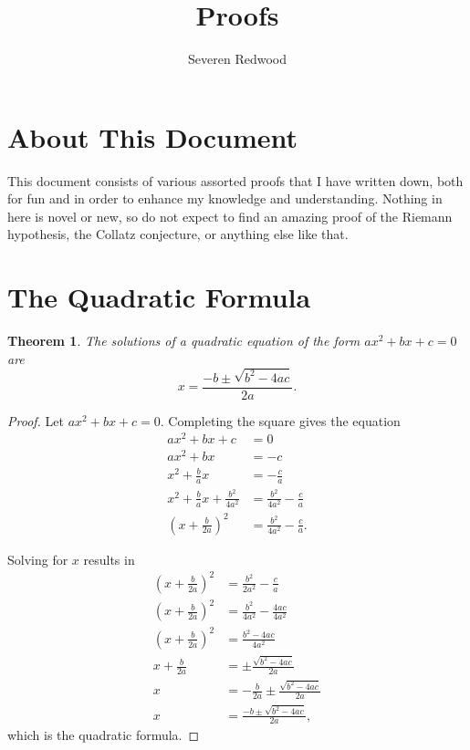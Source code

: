 \documentclass[parskip]{scrartcl}
\title{Proofs}
\author{Severen Redwood}
\newtheorem*{theorem}{Theorem}
\begin{document}
\maketitle

\section{About This Document}

This document consists of various assorted proofs that I have written down, both
for fun and in order to enhance my knowledge and understanding. Nothing in here
is novel or new, so do not expect to find an amazing proof of the Riemann
hypothesis, the Collatz conjecture, or anything else like that.

\section{The Quadratic Formula}

\begin{theorem}
  The solutions of a quadratic equation of the form \(ax^{2} + bx + c = 0\) are
  \[ x = \frac{-b ±\sqrt{b^{2} - 4ac}}{2a}. \]
\end{theorem}

\begin{proof}
  Let \(ax^{2} + bx + c = 0\). Completing the square gives the equation
  \begin{align*}
    ax^{2} + bx + c &= 0 \\
    ax^{2} + bx &= -c \\
    x^{2} + \frac{b}{a}x &= -\frac{c}{a} \\
    x^{2} + \frac{b}{a}x + \frac{b^{2}}{4a^{2}} &= \frac{b^{2}}{4a^{2}} - \frac{c}{a} \\
    {(x + \frac{b}{2a})}^{2} &= \frac{b^{2}}{4a^{2}} - \frac{c}{a}.
  \end{align*}

  Solving for \(x\) results in
  \begin{align*}
    {(x + \frac{b}{2a})}^{2} &= \frac{b^{2}}{2a^{2}} - \frac{c}{a} \\
    {(x + \frac{b}{2a})}^{2} &= \frac{b^{2}}{4a^{2}} - \frac{4ac}{4a^{2}} \\
    {(x + \frac{b}{2a})}^{2} &= \frac{b^{2} - 4ac}{4a^{2}} \\
    x + \frac{b}{2a} &= ±\frac{\sqrt{b^{2} - 4ac}}{2a} \\
    x &= -\frac{b}{2a} ±\frac{\sqrt{b^{2} - 4ac}}{2a} \\
    x &= \frac{-b ± \sqrt{b^{2} - 4ac}}{2a},
  \end{align*}
  which is the quadratic formula.
\end{proof}
\end{document}
